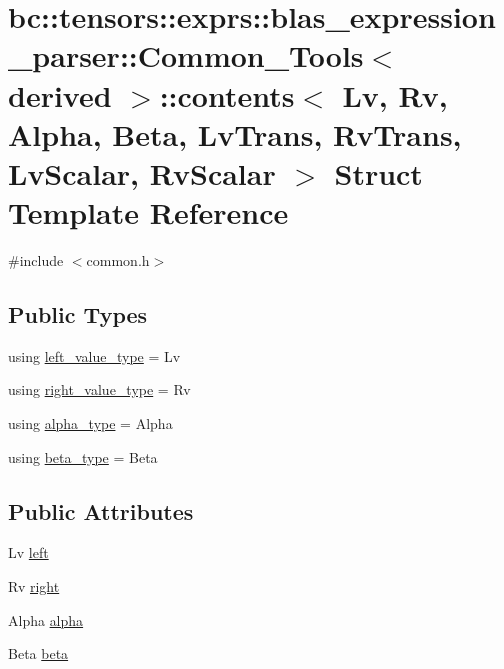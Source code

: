 \hypertarget{structbc_1_1tensors_1_1exprs_1_1blas__expression__parser_1_1Common__Tools_1_1contents}{}\section{bc\+:\+:tensors\+:\+:exprs\+:\+:blas\+\_\+expression\+\_\+parser\+:\+:Common\+\_\+\+Tools$<$ derived $>$\+:\+:contents$<$ Lv, Rv, Alpha, Beta, Lv\+Trans, Rv\+Trans, Lv\+Scalar, Rv\+Scalar $>$ Struct Template Reference}
\label{structbc_1_1tensors_1_1exprs_1_1blas__expression__parser_1_1Common__Tools_1_1contents}


{\ttfamily \#include $<$common.\+h$>$}

\subsection*{Public Types}
\begin{DoxyCompactItemize}
\item 
using \hyperlink{structbc_1_1tensors_1_1exprs_1_1blas__expression__parser_1_1Common__Tools_1_1contents_aa4989645904d8e8c40de6f22d57d517c}{left\+\_\+value\+\_\+type} = Lv
\item 
using \hyperlink{structbc_1_1tensors_1_1exprs_1_1blas__expression__parser_1_1Common__Tools_1_1contents_a4b548e01cf31be2394fd35aca4bd2596}{right\+\_\+value\+\_\+type} = Rv
\item 
using \hyperlink{structbc_1_1tensors_1_1exprs_1_1blas__expression__parser_1_1Common__Tools_1_1contents_a75868f11a9cd4889bad56732956fa26e}{alpha\+\_\+type} = Alpha
\item 
using \hyperlink{structbc_1_1tensors_1_1exprs_1_1blas__expression__parser_1_1Common__Tools_1_1contents_aafb3eef2938d2bea8bf0fc90ef9de7bc}{beta\+\_\+type} = Beta
\end{DoxyCompactItemize}
\subsection*{Public Attributes}
\begin{DoxyCompactItemize}
\item 
Lv \hyperlink{structbc_1_1tensors_1_1exprs_1_1blas__expression__parser_1_1Common__Tools_1_1contents_a7a944c4b77b7884168eaf293bc1942b8}{left}
\item 
Rv \hyperlink{structbc_1_1tensors_1_1exprs_1_1blas__expression__parser_1_1Common__Tools_1_1contents_ac6de593eb6ac9b2c6da0cacb7babf348}{right}
\item 
Alpha \hyperlink{structbc_1_1tensors_1_1exprs_1_1blas__expression__parser_1_1Common__Tools_1_1contents_af312ac58c9704b1df5552e2884e163c7}{alpha}
\item 
Beta \hyperlink{structbc_1_1tensors_1_1exprs_1_1blas__expression__parser_1_1Common__Tools_1_1contents_abdbb20da7426295ede058497a1999566}{beta}
\end{DoxyCompactItemize}
